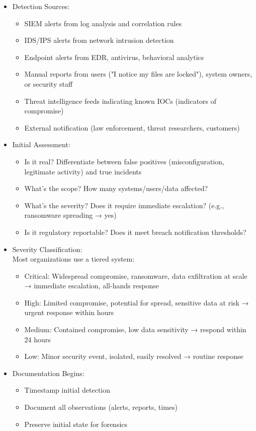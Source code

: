 \documentclass[10pt]{article}
\begin{document}
\begin{itemize}
  \item Detection Sources:
  \begin{itemize}
  	\item SIEM alerts from log analysis and correlation rules
  	\item IDS/IPS alerts from network intrusion detection
  	\item Endpoint alerts from EDR, antivirus, behavioral analytics
  	\item Manual reports from users ("I notice my files are locked"), system owners, or security staff
  	\item Threat intelligence feeds indicating known IOCs (indicators of compromise)
  	\item External notification (law enforcement, threat researchers, customers)
  \end{itemize}
  \item Initial Assessment:
  \begin{itemize}
  	\item Is it real? Differentiate between false positives (misconfiguration, legitimate activity) and true incidents
  	\item What's the scope? How many systems/users/data affected?
  	\item What's the severity? Does it require immediate escalation? (e.g., ransomware spreading → yes)
  	\item Is it regulatory reportable? Does it meet breach notification thresholds?
  \end{itemize}
  \item Severity Classification:\\
  Most organizations use a tiered system:
  
  \begin{itemize}
  	\item Critical: Widespread compromise, ransomware, data exfiltration at scale → immediate escalation, all-hands response
  	\item High: Limited compromise, potential for spread, sensitive data at risk → urgent response within hours
  	\item Medium: Contained compromise, low data sensitivity → respond within 24 hours
  	\item Low: Minor security event, isolated, easily resolved → routine response
  \end{itemize}
  \item Documentation Begins:
  \begin{itemize}
  	\item Timestamp initial detection
  	\item Document all observations (alerts, reports, times)
  	\item Preserve initial state for forensics
  \end{itemize}
\end{itemize}
\end{document}
